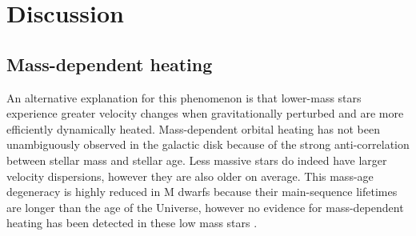 \section{Discussion}
\label{sec:discussion}

\subsection{Mass-dependent heating}

An alternative explanation for this phenomenon is that lower-mass stars
experience greater velocity changes when gravitationally perturbed and are
more efficiently dynamically heated.
Mass-dependent orbital heating has not been unambiguously observed in the
galactic disk because of the strong anti-correlation between stellar mass and
stellar age.
Less massive stars do indeed have larger velocity dispersions, however they
are also older on average.
This mass-age degeneracy is highly reduced in M dwarfs because their
main-sequence lifetimes are longer than the age of the Universe, however no
evidence for mass-dependent heating has been detected in these low mass stars
\citep{faherty2009}.

